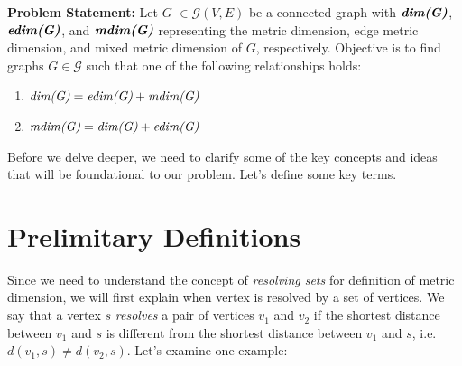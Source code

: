 \documentclass[12pt]{amsart}
\theoremstyle{plain}
\begin{document}
\vspace{0.2cm}

\begin{mdframed}[backgroundcolor=color_blue_1!10, linecolor=color_blue_2, linewidth=2pt, roundcorner=10pt, innertopmargin=10pt, innerbottommargin=10pt, skipabove=5pt, skipbelow=5pt]
  \textbf{Problem Statement:} Let \textbf{$G$} $ \in \mathcal{G}(V, E)$ be a connected graph with $\textit{\textbf{dim(G)}}$, $\textit{\textbf{edim(G)}}$, and $\textit{\textbf{mdim(G)}}$ representing the metric dimension, edge metric dimension, and mixed metric dimension of $G$, respectively. Objective is to find graphs $G \in \mathcal{G}$ such that one of the following relationships holds:
  \begin{enumerate}
      \centering
    \item $\textit{\text{dim(G)}} = \textit{\text{edim(G)}} + \textit{\text{mdim(G)}}$
    \item $\textit{\text{mdim(G)}} = \textit{\text{dim(G)}} + \textit{\text{edim(G)}}$
  \end{enumerate}
\end{mdframed}

\vspace{0.2cm}

Before we delve deeper, we need to clarify some of the key concepts and ideas that will be foundational to our problem. Let's define some key terms.

\vspace{0.2cm}

\section{Prelimitary Definitions}

Since we need to understand the concept of \textit{resolving sets} for definition of metric dimension, we will first explain when vertex is resolved by a set of vertices. We say that a vertex $s$ \textit{resolves} a pair of vertices $v_1$ and $v_2$ if the shortest distance between $v_1$ and $s$ is different from the shortest distance between $v_1$ and $s$, i.e. $d(v_1, s) \neq d(v_2, s)$. Let's examine one example:

\vspace{-0.2cm}
\end{document}

